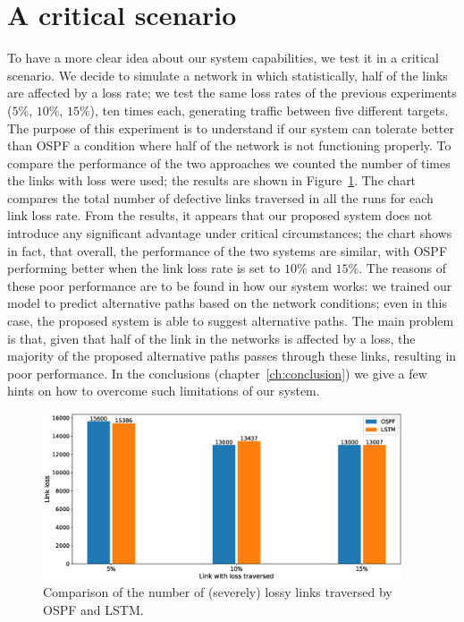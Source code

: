 \section{A critical scenario}
To have a more clear idea about our system capabilities, we test it in a critical scenario. We decide to simulate a network in which statistically, half of the links are affected by a loss rate; we test the same loss rates of the previous experiments ($5\%$, $10\%$, $15\%$), ten times each, generating traffic between five different targets. The purpose of this experiment is to understand if our system can tolerate better than OSPF a condition where half of the network is not functioning properly. To compare the performance of the two approaches we counted the number of times the links with loss were used; the results are shown in Figure~\ref{fig:stress_test}. The chart compares the total number of defective links traversed in all the runs for each link loss rate. From the results, it appears that our proposed system does not introduce any significant advantage under critical circumstances; the chart shows in fact, that overall, the performance of the two systems are similar, with OSPF performing better when the link loss rate is set to $10\%$ and $15\%$. The reasons of these poor performance are to be found in how our system works: we trained our model to predict alternative paths based on the network conditions; even in this case, the proposed system is able to suggest alternative paths. The main problem is that, given that half of the link in the networks is affected by a loss, the majority of the proposed alternative paths passes through these links, resulting in poor performance. In the conclusions (chapter~\ref{ch:conclusion}) we give a few hints on how to overcome such limitations of our system.

\begin{figure}[]
\centering
\includegraphics[width=0.949\textwidth]{img/stress_test}
\caption{Comparison of the number of (severely) lossy links traversed by OSPF and LSTM.}
\label{fig:stress_test}
\end{figure}
